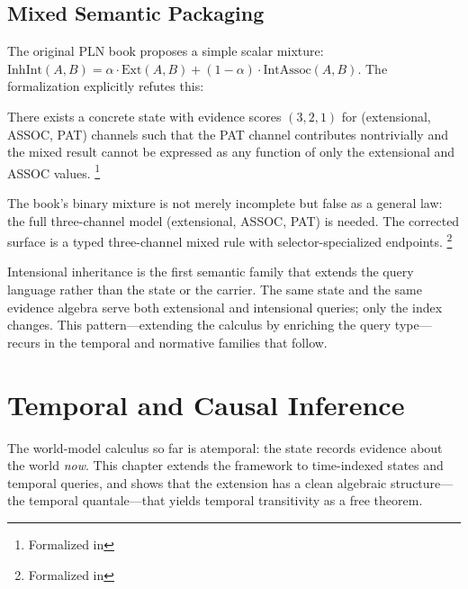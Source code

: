 \documentclass[11pt,openany]{report}
\begin{document}
\section{Mixed Semantic Packaging}

The original PLN book proposes a simple scalar mixture:
$\mathrm{InhInt}(A, B) = \alpha \cdot \mathrm{Ext}(A, B)
+ (1 - \alpha) \cdot \mathrm{IntAssoc}(A, B)$.  The formalization
explicitly refutes this:

\begin{theorem}
\label{thm:no-mixed-policy}
There exists a concrete state with evidence scores $(3, 2, 1)$ for
(extensional, ASSOC, PAT) channels such that the PAT channel
contributes nontrivially and the mixed result cannot be expressed
as any function of only the extensional and ASSOC values.%
\footnote{Formalized in
}
\end{theorem}

\noindent
The book's binary mixture is not merely incomplete but false as a
general law: the full three-channel model (extensional, ASSOC, PAT)
is needed.  The corrected surface is a typed three-channel mixed
rule with selector-specialized endpoints.%
\footnote{Formalized in
}

\medskip\noindent
Intensional inheritance is the first semantic family that extends
the query language rather than the state or the carrier.  The
same state and the same evidence algebra serve both extensional and
intensional queries; only the  index
changes.  This pattern---extending the calculus by enriching the
query type---recurs in the temporal and normative families that
follow.



\chapter{Temporal and Causal Inference}
\label{ch:temporal}

The world-model calculus so far is atemporal: the state records
evidence about the world \emph{now}.  This chapter extends the
framework to time-indexed states and temporal queries, and shows
that the extension has a clean algebraic structure---the temporal
quantale---that yields temporal transitivity as a free theorem.
\end{document}
